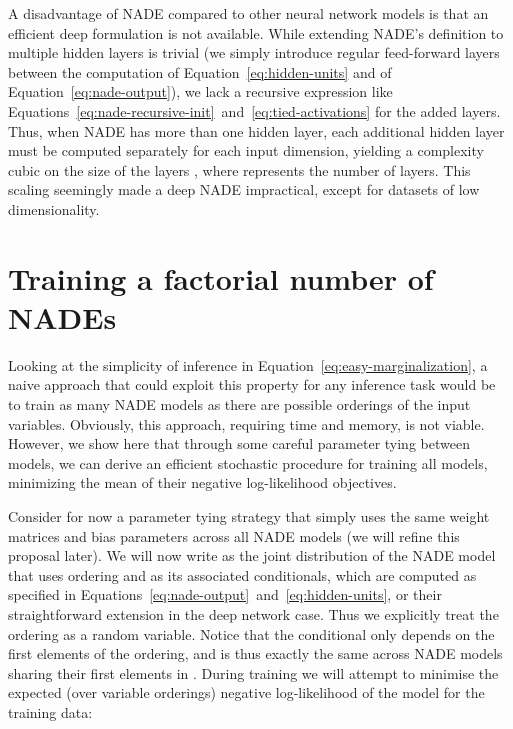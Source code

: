 \documentclass{article}
\newcommand{\citeg}[1]{\citep[e.g.,][]{#1}}
\renewcommand{\vec}[1]{\boldsymbol{#1}}
\newcommand{\expectation}{\mathop{\mathbb{E}}\limits}
\begin{document}
A disadvantage of NADE compared to other neural network models is that an efficient
deep formulation \citeg{bengio2009learning} is not available. While extending NADE's definition to multiple hidden layers is trivial
(we simply introduce regular feed-forward layers between the computation
of Equation~\ref{eq:hidden-units} and of Equation~\ref{eq:nade-output}),
we lack a recursive expression like Equations~\ref{eq:nade-recursive-init}~and~\ref{eq:tied-activations}
for the added layers. Thus, when NADE has more than
one hidden layer, each additional hidden layer must be computed separately for each input dimension,
yielding a complexity cubic on the
size of the layers , where  represents the number of layers. This
scaling seemingly made a deep NADE impractical, except for datasets of low dimensionality.

\section{Training a factorial number of NADEs}

Looking at the simplicity of inference in
Equation~\eqref{eq:easy-marginalization}, a naive approach that could exploit
this property for any inference task would be to train as many NADE
models as there are possible orderings of the input variables. Obviously,
this approach, requiring  time and memory, is not viable. However, we
show here that through some careful parameter tying between models, we can
derive an efficient stochastic procedure for training all models, minimizing
the mean of their negative log-likelihood objectives.

Consider for now a parameter tying strategy that simply uses the same
weight matrices and bias parameters across all NADE models (we will
refine this proposal later). We will now write  as the joint distribution of the NADE model that uses
ordering  and  as its associated conditionals, which are
computed as specified in
Equations~\eqref{eq:nade-output}~and~\eqref{eq:hidden-units}, or their
straightforward extension in the deep network case. Thus we explicitly treat
the ordering  as a random variable. Notice that the  conditional
only depends on the first  elements of the ordering, and is thus
exactly the same across NADE models sharing their first  elements in .
 During training we will
attempt to minimise the expected (over variable orderings) negative
log-likelihood of the model for the training data:
\newcommand{\expectationorderings}{\expectation_{o \in D!}}
\newcommand{\expectationoltd}{\expectation_{o_{<d}}}
\newcommand{\expectationogtd}{\expectation_{o_{>d}}}
\newcommand{\expectationod}{\expectation_{o_{d}}}
\newcommand{\expectationtrainingdata}{\expectation_{\vec{x^{(n)}}\in\vec{X}}}
\newcommand{\sumtrainingdata}{\sum_{\vec{x^{(n)}}\in\vec{X}}}
\end{document}

